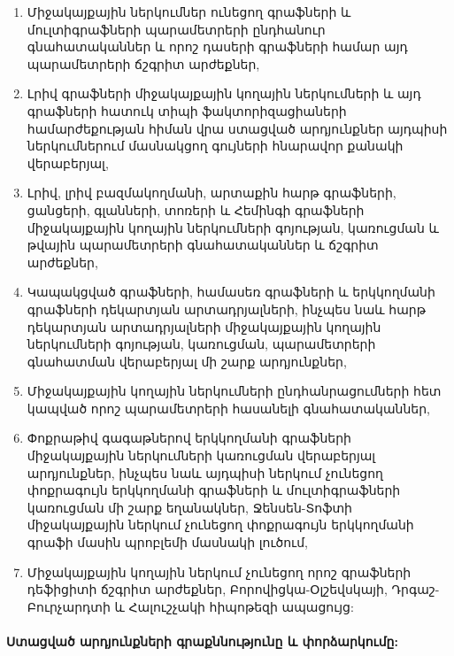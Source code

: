 \begin{enumerate}
    \itemsep0em 
    \item Միջակայքային ներկումներ ունեցող գրաֆների և մուլտիգրաֆների պարամետրերի ընդհանուր գնահատականներ և որոշ դասերի գրաֆների համար այդ պարամետրերի ճշգրիտ արժեքներ,
    \item Լրիվ գրաֆների միջակայքային կողային ներկումների և այդ գրաֆների հատուկ տիպի ֆակտորիզացիաների համարժեքության հիման վրա ստացված արդյունքներ այդպիսի ներկումներում մասնակցող գույների հնարավոր քանակի վերաբերյալ,
    \item Լրիվ, լրիվ բազմակողմանի, արտաքին հարթ գրաֆների, ցանցերի, գլանների, տոռերի և Հեմինգի գրաֆների միջակայքային կողային ներկումների գոյության, կառուցման և թվային պարամետրերի գնահատականներ և ճշգրիտ արժեքներ,
    \item Կապակցված գրաֆների, համասեռ գրաֆների և երկկողմանի գրաֆների դեկարտյան արտադրյալների, ինչպես նաև հարթ դեկարտյան արտադրյալների միջակայքային կողային ներկումների գոյության, կառուցման, պարամետրերի գնահատման վերաբերյալ մի շարք արդյունքներ,
    \item Միջակայքային կողային ներկումների ընդհանրացումների հետ կապված որոշ պարամետրերի հասանելի գնահատականներ,
    \item Փոքրաթիվ գագաթներով երկկողմանի գրաֆների միջակայքային ներկումների կառուցման վերաբերյալ արդյունքներ, ինչպես նաև այդպիսի ներկում չունեցող փոքրագույն երկկողմանի գրաֆների և մուլտիգրաֆների կառուցման մի շարք եղանակներ, Ջենսեն-Տոֆտի միջակայքային ներկում չունեցող փոքրագույն երկկողմանի գրաֆի մասին պրոբլեմի մասնակի լուծում,
    \item Միջակայքային կողային ներկում չունեցող որոշ գրաֆների դեֆիցիտի ճշգրիտ արժեքներ, Բորովիցկա-Օլշեվսկայի, Դրգաշ-Բուրչարդտի և Հալուշչակի հիպոթեզի ապացույց:
\end{enumerate}

\paragraph{Ստացված արդյունքների գրաքննությունը և փորձարկումը:}

